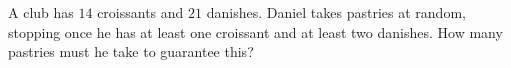 A club has $14$ croissants and $21$ danishes. Daniel takes pastries at random, stopping once he has at least one croissant and at least two danishes. How many pastries must he take to guarantee this?
